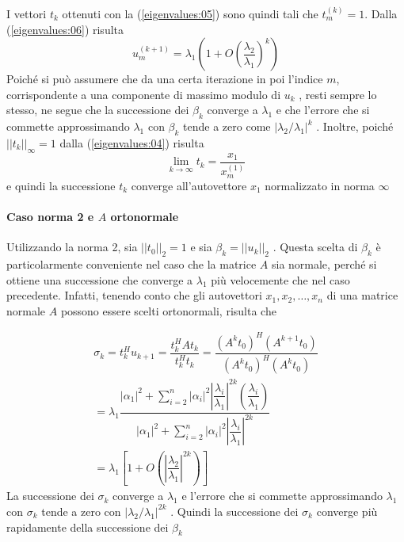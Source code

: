 I vettori $t_k$ ottenuti con la (\ref{eigenvalues:05})
sono quindi tali che $t_m^{(k)} = 1$. Dalla (\ref{eigenvalues:06})
risulta
$$ u_m^{(k+1)} = \lambda_1 \left(  1 + O\left( \frac{\lambda_2}{\lambda_1} \right)^{k} \right) $$
Poich\'e  si pu\`o assumere che da una certa iterazione in poi l'indice $m$,
corrispondente a una componente di massimo modulo di $u_k$ , resti sempre lo
stesso, ne segue che la successione dei $\beta_k$ converge a $\lambda_1$ e che
 l'errore che si commette approssimando $\lambda_1$ con $\beta_k$ tende a zero
come $|\lambda_2 / \lambda_1 |^k$ . Inoltre,
poich\'e $||t_k||_{\infty} = 1$ dalla   (\ref{eigenvalues:04}) risulta
$$
\lim_{k \to \infty} t_k = \dfrac{x_1}{x_m^{(1)}}
$$
e quindi la successione $t_k$ converge all'autovettore $x_1$ normalizzato in
norma $\infty$



\paragraph{Caso norma 2 e $A$ ortonormale}
Utilizzando la norma 2, sia $||t_0||_2 = 1$ e sia $\beta_k = ||u_k||_2$ .
 Questa scelta di $\beta_k$ \`e particolarmente conveniente nel caso che la
 matrice $A$ sia normale, perch\'e si ottiene una successione che converge
 a $\lambda_1$ pi\`u velocemente che nel
caso precedente. Infatti, tenendo conto che gli autovettori
$x_1 , x_2 , \ldots , x_n$ di una matrice normale $A$ possono essere scelti
ortonormali, risulta che

$$
\begin{array}{l}
\sigma_k = t_k^{H}u_{k+1} = \dfrac{t_k^{H}At_k}{t_k^{H}t_k} =
\dfrac{(A^{k} t_0)^{H} (A^{k+1}t_0)}{(A^{k}t_0)^{H} (A^{k}t_0)}  \\
= \lambda_1 \dfrac{|\alpha_1|^{2} + \displaystyle
 \sum_{i=2}^{n} |\alpha_i|^{2}
 \left|\dfrac{\lambda_i}{\lambda_1} \right|^{2k} \left(\dfrac{\lambda_i}{\lambda_1} \right) }
{|\alpha_1|^{2} + \displaystyle \sum_{i=2}^{n} |\alpha_i|^{2}
 \left|\dfrac{\lambda_i}{\lambda_1} \right|^{2k} } \\
= \lambda_1 \left[ 1 + O\left(\left|\dfrac{\lambda_2}{\lambda_1}\right|^{2k} \right) \right]
\end{array}
$$
La successione dei $\sigma_k$ converge a $\lambda_1$ e l'errore che si commette
approssimando $\lambda_1$ con $\sigma_k$ tende a zero con
$|\lambda_2 /\lambda_1 |^{2k}$ . Quindi la successione dei $\sigma_k$ converge
pi\`u rapidamente della successione dei $\beta_k$


